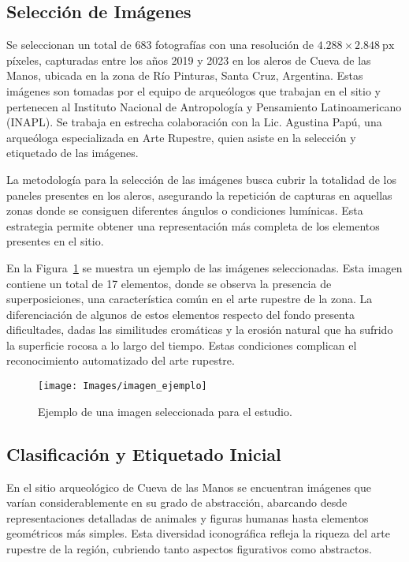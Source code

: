 \subsection{Selección de Imágenes}
Se seleccionan un total de 683 fotografías con una resolución de \(4.288 \times 2.848\ \text{px}\) píxeles, capturadas entre los años 2019 y 2023 en los aleros de Cueva de las Manos, ubicada en la zona de Río Pinturas, Santa Cruz, Argentina.
Estas imágenes son tomadas por el equipo de arqueólogos que trabajan en el sitio y pertenecen al Instituto Nacional de Antropología y Pensamiento Latinoamericano (INAPL).
Se trabaja en estrecha colaboración con la Lic. Agustina Papú, una arqueóloga especializada en Arte Rupestre, quien asiste en la selección y etiquetado de las imágenes.

La metodología para la selección de las imágenes busca cubrir la totalidad de los paneles presentes en los aleros, asegurando la repetición de capturas en aquellas zonas donde se consiguen diferentes ángulos o condiciones lumínicas.
Esta estrategia permite obtener una representación más completa de los elementos presentes en el sitio.

En la Figura~\ref{fig:imagen_ejemplo} se muestra un ejemplo de las imágenes seleccionadas. Esta imagen contiene un total de 17 elementos, donde se observa la presencia de superposiciones, una característica común en el arte rupestre de la zona.
La diferenciación de algunos de estos elementos respecto del fondo presenta dificultades, dadas las similitudes cromáticas y la erosión natural que ha sufrido la superficie rocosa a lo largo del tiempo.
Estas condiciones complican el reconocimiento automatizado del arte rupestre.

\begin{figure}[htpb]
    \centering
    \texttt{[image: Images/imagen\_ejemplo]}
    \caption{Ejemplo de una imagen seleccionada para el estudio.}
    \label{fig:imagen_ejemplo}
\end{figure}

\subsection{Clasificación y Etiquetado Inicial}

En el sitio arqueológico de Cueva de las Manos se encuentran imágenes que varían considerablemente en su grado de abstracción, abarcando desde representaciones detalladas de animales y figuras humanas hasta elementos geométricos más simples.
Esta diversidad iconográfica refleja la riqueza del arte rupestre de la región, cubriendo tanto aspectos figurativos como abstractos.

